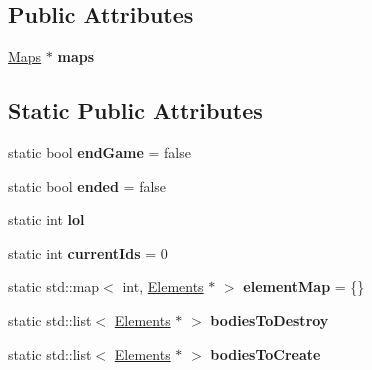 \subsection*{Public Attributes}
\begin{DoxyCompactItemize}
\item 
\hypertarget{class_game_adef62d41374c1440a78855c7f9994697}{\hyperlink{class_maps}{Maps} $\ast$ {\bfseries maps}}\label{class_game_adef62d41374c1440a78855c7f9994697}

\end{DoxyCompactItemize}
\subsection*{Static Public Attributes}
\begin{DoxyCompactItemize}
\item 
\hypertarget{class_game_a6f05b1c88b1086147854b72defced72a}{static bool {\bfseries end\+Game} = false}\label{class_game_a6f05b1c88b1086147854b72defced72a}

\item 
\hypertarget{class_game_aa7b98d72784b65dbef9070b638542b05}{static bool {\bfseries ended} = false}\label{class_game_aa7b98d72784b65dbef9070b638542b05}

\item 
\hypertarget{class_game_ac52883575849c7580b0b9dba48aef174}{static int {\bfseries lol}}\label{class_game_ac52883575849c7580b0b9dba48aef174}

\item 
\hypertarget{class_game_ae5bfa29230411c2605787261070909e6}{static int {\bfseries current\+Ids} = 0}\label{class_game_ae5bfa29230411c2605787261070909e6}

\item 
\hypertarget{class_game_a88aa459a01bbc438e665a19c53732c0e}{static std\+::map$<$ int, \hyperlink{class_elements}{Elements} $\ast$ $>$ {\bfseries element\+Map} = \{\}}\label{class_game_a88aa459a01bbc438e665a19c53732c0e}

\item 
\hypertarget{class_game_a078c48086258daf73a89bf4bde485969}{static std\+::list$<$ \hyperlink{class_elements}{Elements} $\ast$ $>$ {\bfseries bodies\+To\+Destroy}}\label{class_game_a078c48086258daf73a89bf4bde485969}

\item 
\hypertarget{class_game_a04166a78d83b34000f7ab31d867fef27}{static std\+::list$<$ \hyperlink{class_elements}{Elements} $\ast$ $>$ {\bfseries bodies\+To\+Create}}\label{class_game_a04166a78d83b34000f7ab31d867fef27}


\end{DoxyCompactItemize}
